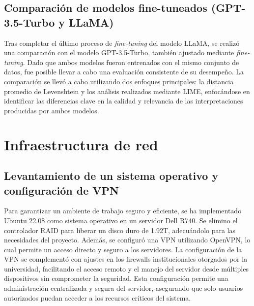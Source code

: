 \subsection{Comparación de modelos fine-tuneados (GPT-3.5-Turbo y LLaMA)}

Tras completar el último proceso de \textit{fine-tuning} del modelo LLaMA, se realizó una comparación con el modelo GPT-3.5-Turbo, también ajustado mediante \textit{fine-tuning}. Dado que ambos modelos fueron entrenados con el mismo conjunto de datos, fue posible llevar a cabo una evaluación consistente de su desempeño. La comparación se llevó a cabo utilizando dos enfoques principales: la distancia promedio de Levenshtein y los análisis realizados mediante LIME, enfocándose en identificar las diferencias clave en la calidad y relevancia de las interpretaciones producidas por ambos modelos.











































\section{Infraestructura de red}

\subsection{Levantamiento de un sistema operativo y configuración de VPN}

Para garantizar un ambiente de trabajo seguro y eficiente, se ha implementado Ubuntu 22.08 como sistema operativo en un servidor Dell R740. Se elimino el controlador RAID para liberar un disco duro de 1.92T, adecuándolo para las necesidades del proyecto. Además, se configuró una VPN utilizando OpenVPN, lo cual permite un acceso directo y seguro a los servidores. La configuración de la VPN se complementó con ajustes en los firewalls institucionales otorgados por la universidad, facilitando el acceso remoto y el manejo del servidor desde múltiples dispositivos sin comprometer la seguridad. Esta configuración permite una administración centralizada y segura del servidor, asegurando que solo usuarios autorizados puedan acceder a los recursos críticos del sistema. 

